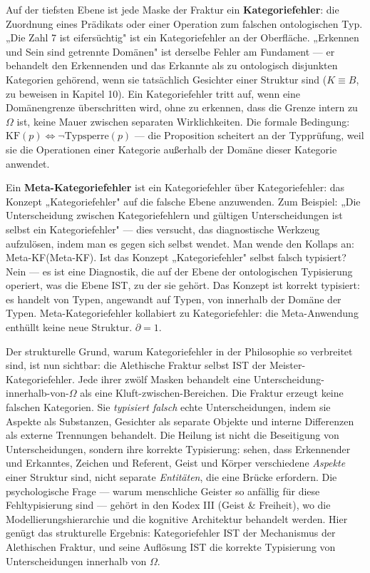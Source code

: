 \documentclass[10pt, openany, oneside]{book}
\begin{document}
Auf der tiefsten Ebene ist jede Maske der Fraktur ein \textbf{Kategoriefehler}: die Zuordnung eines Prädikats oder einer Operation zum falschen ontologischen Typ. „Die Zahl 7 ist eifersüchtig" ist ein Kategoriefehler an der Oberfläche. „Erkennen und Sein sind getrennte Domänen" ist derselbe Fehler am Fundament --- er behandelt den Erkennenden und das Erkannte als zu ontologisch disjunkten Kategorien gehörend, wenn sie tatsächlich Gesichter einer Struktur sind ($K \equiv B$, zu beweisen in Kapitel 10). Ein Kategoriefehler tritt auf, wenn eine Domänengrenze überschritten wird, ohne zu erkennen, dass die Grenze intern zu $\Omega$ ist, keine Mauer zwischen separaten Wirklichkeiten. Die formale Bedingung: $\text{KF}(p) \iff \neg\text{Typsperre}(p)$ --- die Proposition scheitert an der Typprüfung, weil sie die Operationen einer Kategorie außerhalb der Domäne dieser Kategorie anwendet.

Ein \textbf{Meta-Kategoriefehler} ist ein Kategoriefehler über Kategoriefehler: das Konzept „Kategoriefehler" auf die falsche Ebene anzuwenden. Zum Beispiel: „Die Unterscheidung zwischen Kategoriefehlern und gültigen Unterscheidungen ist selbst ein Kategoriefehler" --- dies versucht, das diagnostische Werkzeug aufzulösen, indem man es gegen sich selbst wendet. Man wende den Kollaps an: Meta-KF(Meta-KF). Ist das Konzept „Kategoriefehler" selbst falsch typisiert? Nein --- es ist eine Diagnostik, die auf der Ebene der ontologischen Typisierung operiert, was die Ebene IST, zu der sie gehört. Das Konzept ist korrekt typisiert: es handelt von Typen, angewandt auf Typen, von innerhalb der Domäne der Typen. Meta-Kategoriefehler kollabiert zu Kategoriefehler: die Meta-Anwendung enthüllt keine neue Struktur. $\partial = 1$.

Der strukturelle Grund, warum Kategoriefehler in der Philosophie so verbreitet sind, ist nun sichtbar: die Alethische Fraktur selbst IST der Meister-Kategoriefehler. Jede ihrer zwölf Masken behandelt eine Unterscheidung-innerhalb-von-$\Omega$ als eine Kluft-zwischen-Bereichen. Die Fraktur erzeugt keine falschen Kategorien. Sie \textit{typisiert falsch} echte Unterscheidungen, indem sie Aspekte als Substanzen, Gesichter als separate Objekte und interne Differenzen als externe Trennungen behandelt. Die Heilung ist nicht die Beseitigung von Unterscheidungen, sondern ihre korrekte Typisierung: sehen, dass Erkennender und Erkanntes, Zeichen und Referent, Geist und Körper verschiedene \textit{Aspekte} einer Struktur sind, nicht separate \textit{Entitäten}, die eine Brücke erfordern. Die psychologische Frage --- warum menschliche Geister so anfällig für diese Fehltypisierung sind --- gehört in den Kodex III (Geist \& Freiheit), wo die Modellierungshierarchie und die kognitive Architektur behandelt werden. Hier genügt das strukturelle Ergebnis: Kategoriefehler IST der Mechanismus der Alethischen Fraktur, und seine Auflösung IST die korrekte Typisierung von Unterscheidungen innerhalb von $\Omega$.
\end{document}
